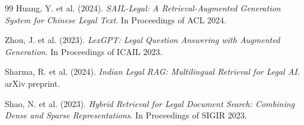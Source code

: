 \documentclass[12pt,a4paper]{report}
\begin{document}
\begin{thebibliography}{99}
 Huang, Y. et al. (2024). \textit{SAIL-Legal: A Retrieval-Augmented Generation System for Chinese Legal Text}. In Proceedings of ACL 2024.

 Zhou, J. et al. (2023). \textit{LexGPT: Legal Question Answering with Augmented Generation}. In Proceedings of ICAIL 2023.

 Sharma, R. et al. (2024). \textit{Indian Legal RAG: Multilingual Retrieval for Legal AI}. arXiv preprint.

 Shao, N. et al. (2023). \textit{Hybrid Retrieval for Legal Document Search: Combining Dense and Sparse Representations}. In Proceedings of SIGIR 2023.

\end{thebibliography}
\end{document}
